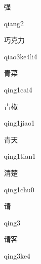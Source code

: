 \begin{multicols*}{2}
\begin{verbete}[qiang2]{强}
\begin{pronuncia}{qiang2}
\end{pronuncia}
\end{verbete}

\begin{verbete}[qiao3ke4li4]{巧克力}
\begin{pronuncia}{qiao3ke4li4}
\end{pronuncia}
\end{verbete}

\begin{verbete}{青菜}
\begin{pronuncia}{qing1cai4}
\end{pronuncia}
\end{verbete}

\begin{verbete}{青椒}
\begin{pronuncia}{qing1jiao1}
\end{pronuncia}
\end{verbete}

\begin{verbete}{青天}
\begin{pronuncia}{qing1tian1}
\end{pronuncia}
\end{verbete}

\begin{verbete}{清楚}
\begin{pronuncia}{qing1chu0}
\end{pronuncia}
\end{verbete}

\begin{verbete}[qing3]{请}
\begin{pronuncia}{qing3}
\end{pronuncia}
\end{verbete}

\begin{verbete}[qing3ke4]{请客}
\begin{pronuncia}{qing3ke4}
\end{pronuncia}
\end{verbete}


\end{multicols*}
